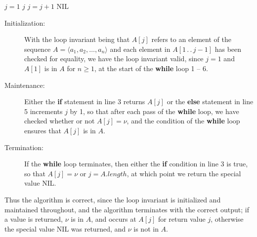 \begin{algorithmic}[1]
    \STATE $j = 1$
    \RETURN $j$
    \ELSE
    \STATE $j = j + 1$
    \ENDIF
    \ENDWHILE
    \RETURN \textrm{NIL}
\end{algorithmic}

\begin{description}
    \item[Initialization:] With the loop invariant being that $A[j]$ refers to an 
        element of the sequence $A = \langle a_1, a_2, \ldots, a_n \rangle$ and 
        each element in $A[1\, .\, .\, j - 1]$ has been checked for equality, we 
        have the loop invariant valid, since $j = 1$ and $A[1]$ is in $A$ for 
        $n \ge 1$, at the start of the \textbf{while} loop 1 -- 6.
    \item[Maintenance:] Either the \textbf{if} statement in line 3 returns $A[j]$
        or the \textbf{else} statement in line 5 increments $j$ by 1, so that after
        each pass of the \textbf{while} loop, we have checked whether or not 
        $A[j] = \nu$, and the condition of the \textbf{while} loop ensures that 
        $A[j]$ is in $A$.
    \item[Termination:] If the \textbf{while} loop terminates, then either the 
        \textbf{if} condition in line 3 is true, so that $A[j] = \nu$ or 
        $j = A.\mathit{length}$, at which point we return the special value
        \textrm{NIL}.
\end{description}

Thus the algorithm is correct, since the loop invariant is initialized and 
maintained throughout, and the algorithm terminates with the correct output;
if a value is returned, $\nu$ is in $A$, and occurs at $A[j]$ for return value
$j$, otherwise the special value \textrm{NIL} was returned, and $\nu$ is not in $A$.

